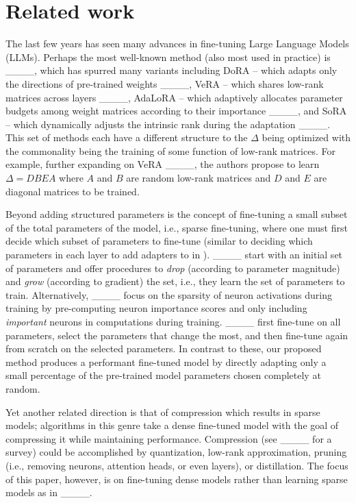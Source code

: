 \section{Related work}
\label{s:related_work}
The last few years has seen many advances in fine-tuning Large Language Models (LLMs). Perhaps the most well-known method (also most used in practice) is \lora ____, which has spurred many variants including DoRA -- which adapts only the directions of pre-trained weights ____, VeRA -- which shares low-rank matrices across layers ____, AdaLoRA -- which adaptively allocates parameter budgets among weight matrices according to their importance ____, and SoRA -- which dynamically adjusts the intrinsic rank during the adaptation ____. This set of methods each have a different structure to the $\Delta$ being optimized with the commonality being the training of some function of low-rank matrices. For example, further expanding on VeRA ____, the authors propose to learn $\Delta=DBEA$ where $A$ and $B$ are random low-rank matrices and $D$ and $E$ are diagonal matrices to be trained. 

Beyond adding structured parameters is the concept of fine-tuning a small subset of the total parameters of the model, i.e., sparse fine-tuning, where one must first decide which subset of parameters to fine-tune (similar to deciding which parameters in each layer to add adapters to in \lora). ____ start with an initial set of parameters and offer procedures to \emph{drop} (according to parameter magnitude) and \emph{grow} (according to gradient) the set, i.e., they learn the set of parameters to train. Alternatively, ____ focus on the sparsity of neuron activations during training by pre-computing neuron importance scores and only including \emph{important} neurons in computations during training. ____ first fine-tune on all parameters, select the parameters that change the most, and then fine-tune again from scratch on the selected parameters. 
In contrast to these, our proposed \sparta method produces a performant fine-tuned model by directly adapting only a small percentage of the pre-trained model parameters chosen completely at random.

Yet another related direction is that of compression which results in sparse models; algorithms in this genre take a dense fine-tuned model with the goal of compressing it while maintaining performance. Compression (see ____ for a survey) could be accomplished by quantization, low-rank approximation, pruning (i.e., removing neurons, attention heads, or even layers), or distillation. The focus of this paper, however, is on fine-tuning dense models rather than learning sparse models as in ____.